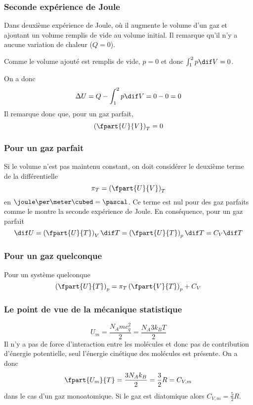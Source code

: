 \subsubsection{Seconde expérience de Joule}
Dans deuxième expérience de Joule,
où il augmente le volume d'un gaz et ajoutant
un volume remplis de vide au volume initial.
Il remarque qu'il n'y a aucune variation de chaleur ($Q = 0$).

Comme le volume ajouté est remplis de vide, $p = 0$ et donc
$\int_1^2 p \dif V = 0$.

On a donc
\[ \Delta U = Q - \int_1^2 p \dif V  = 0 - 0 = 0 \]
Il remarque donc que, pour un gaz parfait,
\[ \left(\fpart{U}{V}\right)_T = 0 \]

\subsubsection{Pour un gaz parfait}
Si le volume n'est pas maintenu constant,
on doit considérer le deuxième terme de la différentielle
\[ \pi_T = \left(\fpart{U}{V}\right)_T \]
en $\joule\per\meter\cubed = \pascal$.
Ce terme est nul pour des gaz parfaits comme le montre
la seconde expérience de Joule.
En conséquence, pour un gaz parfait
\begin{equation}
  \dif U = \left(\fpart{U}{T}\right)_V \dif T =
  \left(\fpart{U}{T}\right)_p \dif T = C_V\dif T \label{eq:peru}
\end{equation}

\subsubsection{Pour un gaz quelconque}
Pour un système quelconque
\begin{equation}
  \left(\fpart{U}{T}\right)_p =
  \pi_T \left(\fpart{V}{T}\right)_p + C_V \label{eq:dudtp}
\end{equation}

\subsubsection{Le point de vue de la mécanique statistique}
\[ U_m = \frac{N_A mc_q^2}{2} = \frac{N_A 3k_BT}{2} \]
Il n'y a pas de force d'interaction entre les molécules et
donc pas de contribution d'énergie potentielle,
seul l'énergie cinétique des molécules est présente.
On a donc
\[ \fpart{U_m}{T} = \frac{3N_A k_B}{2} = \frac 32R = C_{V,m} \]
dans le cas d'un gaz monoatomique.
Si le gaz est diatomique alors $C_{V,m} = \frac 52R$.

